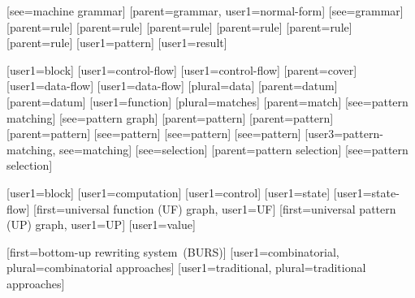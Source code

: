 [see={machine grammar}]
[parent={grammar}, user1={normal-form}]
[see={grammar}]
[parent={rule}]
[parent={rule}]
[parent={rule}]
[parent={rule}]
[parent={rule}]
[parent={rule}]
[user1={pattern}]
[user1={result}]

[user1={block}]
[user1={control-flow}]
[user1={control-flow}]
[parent={cover}]
[user1={data-flow}]
[user1={data-flow}]
[plural={data}]
[parent={datum}]
[parent={datum}]
[user1={function}]
[plural=matches]
[parent={match}]
[see={pattern matching}]
[see={pattern graph}]
[parent={pattern}]
[parent={pattern}]
[parent={pattern}]
[see={pattern}]
[see={pattern}]
[see={pattern}]
[user3={pattern-matching}, see={matching}]
[see={selection}]
[parent={pattern selection}]
[see={pattern selection}]

[user1={block}]
[user1={computation}]
[user1={control}]
[user1={state}]
[user1={state-flow}]
[first={universal function (UF) graph}, user1={UF}]
[first={universal pattern (UP) graph}, user1={UP}]
[user1={value}]

%
        [first=bottom-up rewriting system~(BURS)]
%
        [user1={combinatorial}, plural={combinatorial approaches}]
%
        [user1={traditional}, plural={traditional approaches}]

